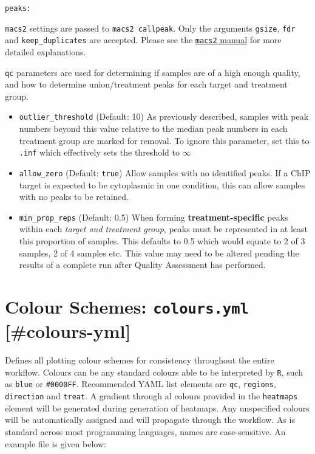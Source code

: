 \documentclass[
]{book}
\providecommand{\tightlist}{%
  \setlength{\itemsep}{0pt}\setlength{\parskip}{0pt}}
\begin{document}
\texttt{peaks:}

\texttt{macs2} settings are passed to \texttt{macs2\ callpeak}. Only the arguments \texttt{gsize}, \texttt{fdr} and \texttt{keep\_duplicates} are accepted.
Please see the \href{https://macs3-project.github.io/MACS/}{\texttt{macs2} manual} for more detailed explanations.

\texttt{qc} parameters are used for determining if samples are of a high enough quality, and how to determine union/treatment peaks for each target and treatment group.

\begin{itemize}
\tightlist
\item
  \texttt{outlier\_threshold} (Default: 10) As previously described, samples with peak numbers beyond this value relative to the median peak numbers in each treatment group are marked for removal. To ignore this parameter, set this to \texttt{.inf} which effectively sets the threshold to \(\infty\)
\item
  \texttt{allow\_zero} (Default: \texttt{true}) Allow samples with no identified peaks. If a ChIP target is expected to be cytoplasmic in one condition, this can allow samples with no peaks to be retained.
\item
  \texttt{min\_prop\_reps} (Default: 0.5) When forming \textbf{treatment-specific} peaks within each \emph{target and treatment group}, peaks must be represented in at least this proportion of samples. This defaults to 0.5 which would equate to 2 of 3 samples, 2 of 4 samples etc. This value may need to be altered pending the results of a complete run after Quality Assessment has performed.
\end{itemize}

\hypertarget{colour-schemes-colours.yml-colours-yml}{%
\section{\texorpdfstring{Colour Schemes: \texttt{colours.yml} {[}\#colours-yml{]}}{Colour Schemes: colours.yml {[}\#colours-yml{]}}}\label{colour-schemes-colours.yml-colours-yml}}

Defines all plotting colour schemes for consistency throughout the entire workflow.
Colours can be any standard colours able to be interpreted by \texttt{R}, such as \texttt{\textquotesingle{}blue\textquotesingle{}} or \texttt{\textquotesingle{}\#0000FF\textquotesingle{}}.
Recommended YAML list elements are \texttt{qc}, \texttt{regions}, \texttt{direction} and \texttt{treat}.
A gradient through al colours provided in the \texttt{heatmaps} element will be generated during generation of heatmaps.
Any unspecified colours will be automatically assigned and will propagate through the workflow.
As is standard across most programming languages, names are case-sensitive.
An example file is given below:
\end{document}
